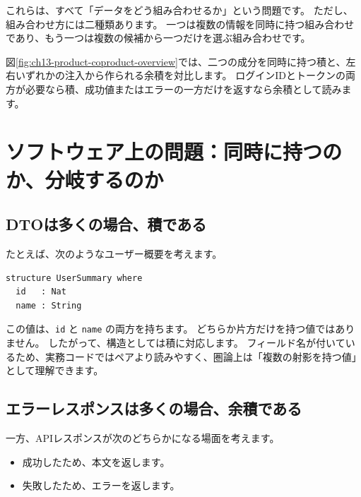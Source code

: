 これらは、すべて「データをどう組み合わせるか」という問題です。
ただし、組み合わせ方には二種類あります。
一つは複数の情報を同時に持つ組み合わせであり、もう一つは複数の候補から一つだけを選ぶ組み合わせです。

図\ref{fig:ch13-product-coproduct-overview}では、二つの成分を同時に持つ積と、左右いずれかの注入から作られる余積を対比します。
ログインIDとトークンの両方が必要なら積、成功値またはエラーの一方だけを返すなら余積として読みます。


\section{ソフトウェア上の問題：同時に持つのか、分岐するのか}

\subsection{DTOは多くの場合、積である}

たとえば、次のようなユーザー概要を考えます。

\begin{listing}[htbp]
\begin{verbatim}
structure UserSummary where
  id   : Nat
  name : String
\end{verbatim}
\caption{\texttt{UserSummary}}
\label{lst:ch13_record_intuition}
\end{listing}

この値は、\texttt{id} と \texttt{name} の両方を持ちます。
どちらか片方だけを持つ値ではありません。
したがって、構造としては積に対応します。
フィールド名が付いているため、実務コードではペアより読みやすく、圏論上は「複数の射影を持つ値」として理解できます。

\subsection{エラーレスポンスは多くの場合、余積である}

一方、APIレスポンスが次のどちらかになる場面を考えます。

\begin{itemize}
\item 成功したため、本文を返します。
\item 失敗したため、エラーを返します。
\end{itemize}

